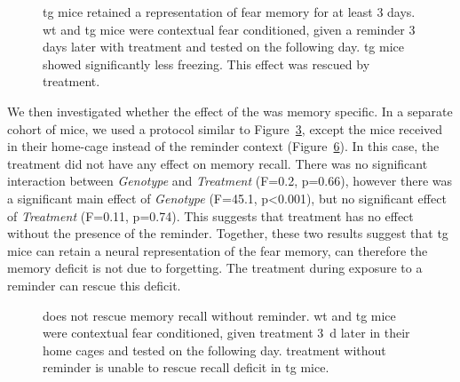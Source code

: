 \begin{figure}[h]
    \begin{subfigure}[h]{\textwidth}
        
        \caption{\label{f.ad.reminder1.paradigm}}
    \end{subfigure}
    \begin{subfigure}[h]{\textwidth}
        
        \caption{\label{f.ad.reminder1.res}}
    \end{subfigure}
    \caption[\tglu{} treatment during a brief reminder rescues memory deficit.]{\gls{tg} mice retained a representation of fear memory for at least 3 days. \gls{wt} and \gls{tg} mice were contextual fear conditioned, given a reminder 3 days later with treatment and tested on the following day. \gls{tg} mice showed significantly less freezing. This effect was rescued by \tglu{} treatment. \label{f.ad.reminder1}}
\end{figure}

We then investigated whether the effect of the \tglu{} was memory specific. In a separate cohort of mice, we used a protocol similar to  Figure~\ref{f.ad.reminder1}, except the mice received \tglu{} in their home-cage instead of the reminder context (Figure~\ref{f.ad.reminder2}). In this case, the \tglu{} treatment did not have any effect on memory recall. There was no significant interaction between \textit{Genotype} and \textit{Treatment} (F=0.2, p=0.66), however there was a significant main effect of \textit{Genotype} (F=45.1, p<0.001), but no significant effect of \textit{Treatment} (F=0.11, p=0.74). This suggests that \tglu{} treatment has no effect without the presence of the reminder. Together, these two results suggest that \gls{tg} mice can retain a neural representation of the fear memory, can therefore the memory deficit is not due to forgetting. The \tglu{} treatment during exposure to a reminder can rescue this deficit. 


\begin{figure}[h]
    \begin{subfigure}[h]{\textwidth}
        
        \caption{\label{f.ad.reminder2.paradigm}}
    \end{subfigure}
    \begin{subfigure}[h]{\textwidth}
        
        \caption{\label{f.ad.reminder2.res}}
    \end{subfigure}
    \caption[\tglu{} treatment does not rescue memory recall without reminder.]{\tglu{} does not rescue memory recall without reminder. \gls{wt} and \gls{tg} mice were contextual fear conditioned, given treatment \SI{3}{\day} later in their home cages and tested on the following day. \tglu{} treatment without reminder is unable to rescue recall deficit in \gls{tg} mice. \label{f.ad.reminder2}}
\end{figure}

